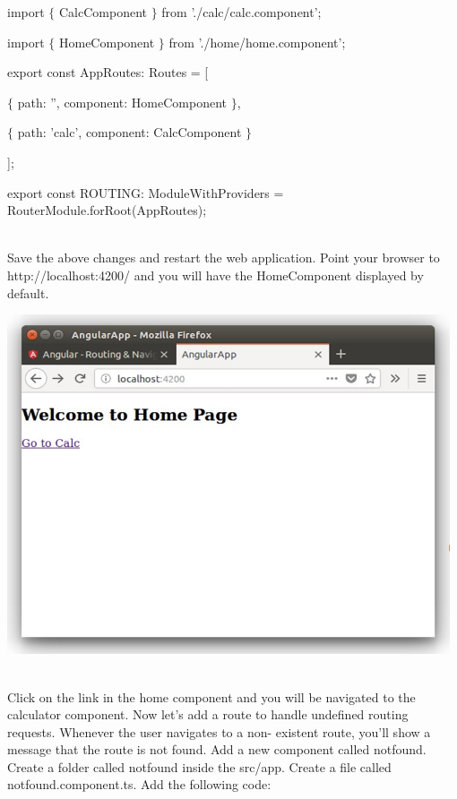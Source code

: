 \documentclass{article}
\begin{document}
\noindent import $\mathrm{\{}$ CalcComponent $\mathrm{\}}$ from './calc/calc.component'; 

\noindent import $\mathrm{\{}$ HomeComponent $\mathrm{\}}$ from './home/home.component';

\noindent 

\noindent export const AppRoutes: Routes = [

\noindent $\mathrm{\{}$ path: '', component: HomeComponent $\mathrm{\}}$,

\noindent $\mathrm{\{}$ path: 'calc', component: CalcComponent $\mathrm{\}}$

\noindent ];

\noindent 

\noindent export const ROUTING: ModuleWithProviders = RouterModule.forRoot(AppRoutes);

\noindent \\ Save the above changes and restart the web application. Point your browser to http://localhost:4200/ and you will have the HomeComponent displayed by default.

\begin{center}
	\noindent \includegraphics*[width=5.15in, height=3.95in]{IMG-05-02}
\end{center}
\newpage
\noindent \\ Click on the link in the home component and you will be navigated to the calculator component. Now let's add a route to handle undefined routing requests. Whenever the user navigates to a non- existent route, you'll show a message that the route is not found. Add a new component called notfound. Create a folder called notfound inside the src/app. Create a file called notfound.component.ts. Add the following code:
\end{document}
